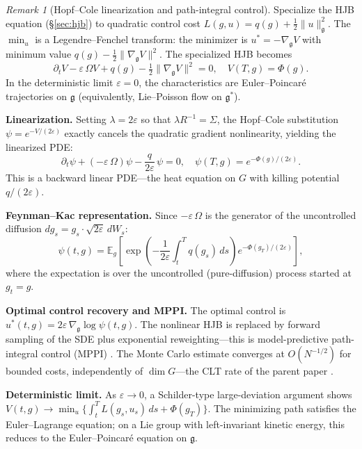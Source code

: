 \documentclass[12pt]{amsart}
\theoremstyle{definition}
\theoremstyle{remark}
\newtheorem*{remark}{Remark}
\begin{document}
\begin{remark}[Hopf--Cole linearization and path-integral control]
Specialize the HJB equation (\S\ref{sec:hjb}) to quadratic control cost
$L(g,u) = q(g) + \tfrac{1}{2}\|u\|_{\mathfrak{g}}^2$.
The $\min_u$ is a Legendre--Fenchel transform: the minimizer is
$u^* = -\nabla_{\mathfrak{g}} V$ with minimum value
$q(g) - \tfrac{1}{2}\|\nabla_{\mathfrak{g}} V\|^2$.
The specialized HJB becomes
\[
\partial_t V - \varepsilon\,\Omega V + q(g)
  - \tfrac{1}{2}\|\nabla_{\mathfrak{g}} V\|^2 = 0,
\quad V(T,g) = \Phi(g).
\]
In the deterministic limit $\varepsilon = 0$, the characteristics are Euler--Poincar\'e trajectories on $\mathfrak{g}$ (equivalently, Lie--Poisson flow on $\mathfrak{g}^*$).

\medskip\noindent\textbf{Linearization.}
Setting $\lambda = 2\varepsilon$ so that $\lambda R^{-1} = \Sigma$,
the Hopf--Cole substitution $\psi = e^{-V/(2\varepsilon)}$ exactly cancels the
quadratic gradient nonlinearity, yielding the linearized PDE:
\[
\partial_t \psi + (-\varepsilon\,\Omega)\psi
  - \frac{q}{2\varepsilon}\,\psi = 0,
\quad \psi(T,g) = e^{-\Phi(g)/(2\varepsilon)}.
\]
This is a backward linear PDE---the heat equation on $G$ with killing
potential $q/(2\varepsilon)$.

\medskip\noindent\textbf{Feynman--Kac representation.}
Since $-\varepsilon\,\Omega$ is the generator of the uncontrolled diffusion
$dg_s = g_s \cdot \sqrt{2\varepsilon}\,dW_s$:
\[
\psi(t,g) = \mathbb{E}_g\!\left[
  \exp\!\left(-\frac{1}{2\varepsilon}\int_t^T q(g_s)\,ds\right)
  e^{-\Phi(g_T)/(2\varepsilon)}
\right],
\]
where the expectation is over the uncontrolled (pure-diffusion) process
started at $g_t = g$.

\medskip\noindent\textbf{Optimal control recovery and MPPI.}
The optimal control is
$u^*(t,g) = 2\varepsilon\,\nabla_{\mathfrak{g}}\log\psi(t,g)$.
The nonlinear HJB is replaced by forward sampling of the SDE plus
exponential reweighting---this is model-predictive path-integral control
(MPPI) \cite{Kappen,Todorov}.
The Monte Carlo estimate converges at $O(N^{-1/2})$ for bounded costs, independently of $\dim G$---the CLT rate of the parent paper \cite{OCT}.

\medskip\noindent\textbf{Deterministic limit.}
As $\varepsilon \to 0$, a Schilder-type large-deviation argument shows
$V(t,g) \to \min_u\bigl\{\int_t^T L(g_s,u_s)\,ds + \Phi(g_T)\bigr\}$.
The minimizing path satisfies the Euler--Lagrange equation; on a Lie group
with left-invariant kinetic energy, this reduces to the Euler--Poincar\'e
equation on $\mathfrak{g}$.
\end{remark}
\end{document}
